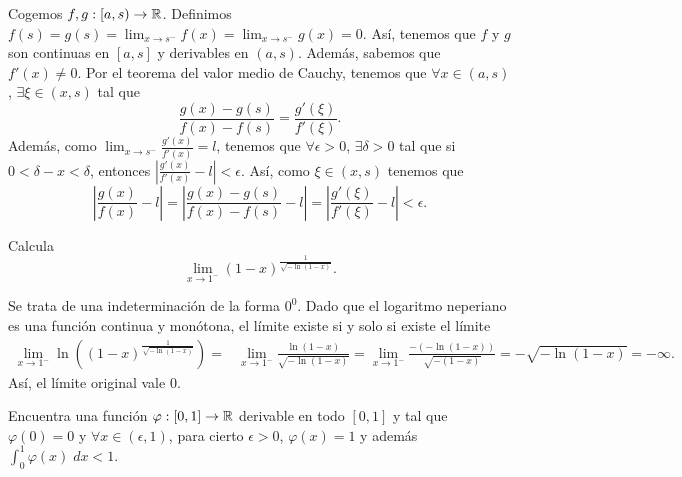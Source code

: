 \documentclass{article}
\begin{document}
\begin{sol}
	Cogemos $\displaystyle f, g : [a,s) \to \mathbb{R} $. Definimos $\displaystyle f\left(s\right) = g\left(s\right) = \lim_{x \to s^{-}}f\left(x\right) = \lim_{x \to s^{-}}g\left(x\right) = 0 $. Así, tenemos que $\displaystyle f $ y $\displaystyle g $ son continuas en $\displaystyle \left[a,s\right]  $ y derivables en $\displaystyle \left(a,s\right) $. Además, sabemos que $\displaystyle f'\left(x\right) \neq 0 $. Por el teorema del valor medio de Cauchy, tenemos que $\displaystyle \forall x \in \left(a,s\right) $, $\displaystyle \exists \xi \in (x,s) $ tal que 
	\[\frac{g\left(x\right)-g\left(s\right)}{f\left(x\right)-f\left(s\right)} = \frac{g'\left(\xi\right)}{f'\left(\xi\right)} .\]
Además, como $\displaystyle \lim_{x \to s^{-}}\frac{g'\left(x\right)}{f'\left(x\right)} = l $, tenemos que $\displaystyle \forall \epsilon > 0 $, $\displaystyle \exists \delta > 0 $ tal que si $\displaystyle 0 < \delta - x < \delta  $, entonces $\displaystyle \left|\frac{g'\left(x\right)}{f'\left(x\right)}-l\right| < \epsilon $. Así, como $\displaystyle \xi \in \left(x,s\right) $ tenemos que 
\[ \left|\frac{g\left(x\right)}{f\left(x\right)}-l\right| = \left|\frac{g\left(x\right)-g\left(s\right)}{f\left(x\right)-f\left(s\right)}-l\right| = \left|\frac{g'\left(\xi\right)}{f'\left(\xi\right)}-l\right| < \epsilon .\]
\end{sol}
\begin{ej}
Calcula  
\[ \lim_{x \to 1^{-}}\left(1-x\right)^{\frac{1}{\sqrt{-\ln\left(1-x\right)}}}.\]
\end{ej}
\begin{sol} Se trata de una indeterminación de la forma $\displaystyle 0^{0} $. Dado que el logaritmo neperiano es una función continua y monótona, el límite existe si y solo si existe el límite
\[
\begin{split}
	\lim_{x \to 1^{-}}\ln\left(\left(1-x\right)^{\frac{1}{\sqrt{-\ln\left(1-x\right)}}}\right) = & \lim_{x \to 1^{-}}\frac{\ln \left(1-x\right)}{\sqrt{-\ln\left(1-x\right)}} = \lim_{x \to 1^{-}}\frac{- \left(-\ln\left(1-x\right)\right)}{\sqrt{-\left(1-x\right)}} = -\sqrt{-\ln\left(1-x\right)} = -\infty.
\end{split}
\]
Así, el límite original vale 0.
\end{sol}
\begin{ej}
	Encuentra una función $\displaystyle \varphi:\left[0,1\right] \to \mathbb{R} $ derivable en todo $\displaystyle \left[0,1\right]  $ y tal que $\displaystyle \varphi\left(0\right)= 0 $ y $\displaystyle \forall x \in \left(\epsilon , 1\right) $, para cierto $\displaystyle \epsilon > 0 $, $\displaystyle \varphi\left(x\right) = 1 $ y además $\displaystyle \int^{1}_{0} \varphi\left(x\right) \; dx < 1 $.
\end{ej}
\end{document}
